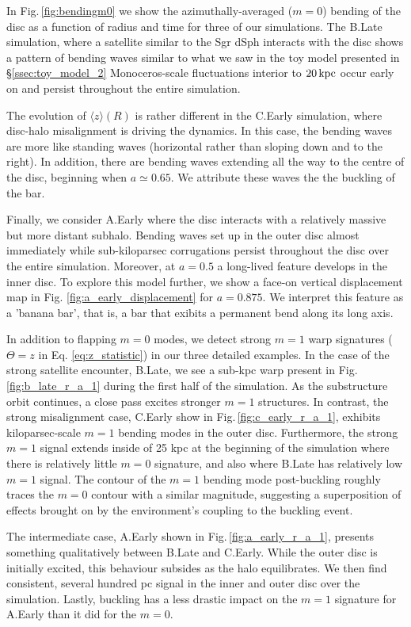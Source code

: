 In Fig.\,\ref{fig:bendingm0} we show the azimuthally-averaged ($m=0$)
bending of the disc as a function of radius and time for three of our
simulations. The B.Late simulation, where a satellite similar to the
Sgr dSph interacts with the disc shows a pattern of bending waves
similar to what we saw in the toy model presented in
\S\ref{ssec:toy_model_2} Monoceros-scale fluctuations interior to
$20\,{\rm kpc}$ occur early on and persist throughout the entire
simulation.

The evolution of $\langle z\rangle(R)$ is rather different in the
C.Early simulation, where disc-halo misalignment is driving the dynamics.
In this case, the bending waves are more like standing waves
(horizontal rather than sloping down and to the right). In addition,
there are bending waves extending all the way to the centre of the
disc, beginning when $a\simeq 0.65$. We attribute these waves the
the buckling of the bar.

Finally, we consider A.Early where the disc interacts with a
relatively massive but more distant subhalo. Bending waves set up in
the outer disc almost immediately while sub-kiloparsec corrugations
persist throughout the disc over the entire simulation. Moreover, at
$a=0.5$ a long-lived feature develops in the inner disc. To explore
this model further, we show a face-on vertical displacement map in Fig.
\ref{fig:a_early_displacement} for $a=0.875$. We interpret this feature
as a 'banana bar', that is, a bar that exibits a permanent bend along
its long axis.

In addition to flapping $m=0$ modes, we detect strong $m=1$ warp
signatures {($\Theta = z$ in Eq. \eqref{eq:z_statistic})} in our three detailed examples. In the case of the strong
satellite encounter, B.Late, we see a sub-kpc warp present in
Fig.\,\ref{fig:b_late_r_a_1} during the first half of the
simulation. As the substructure orbit continues, a close pass excites
stronger $m=1$ structures. In contrast, the strong misalignment case,
C.Early show  in Fig.\,\ref{fig:c_early_r_a_1}, exhibits kiloparsec-scale $m=1$ bending modes in the outer
disc. Furthermore, the strong $m=1$ signal extends inside of 25 kpc at
the beginning of the simulation where there is relatively little $m=0$
signature, and also where B.Late has relatively low $m=1$ signal. The
contour of the $m=1$ bending mode post-buckling roughly traces the
$m=0$ contour with a similar magnitude, suggesting a superposition of
effects brought on by the environment's coupling to the buckling
event.

The intermediate case, A.Early shown in Fig.\,\ref{fig:a_early_r_a_1}, presents something qualitatively
between B.Late and C.Early. While the outer disc is initially excited,
this behaviour subsides as the halo equilibrates. We then find
consistent, several hundred pc signal in the inner and outer disc over
the simulation. Lastly, buckling has a less drastic impact on the
$m=1$ signature for A.Early than it did for the $m=0$.

